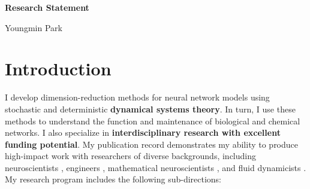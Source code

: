 \documentclass[a4paper,11pt]{article}
\begin{document}
\begin{center}
\Large \textbf{Research Statement}

\Large Youngmin Park
\end{center}

\section{Introduction}

I develop dimension-reduction methods for neural network models using stochastic and deterministic \textbf{dynamical systems theory}. In turn, I use these methods to understand the function and maintenance of biological and chemical networks. I also specialize in \textbf{interdisciplinary research with excellent funding potential}. My publication record demonstrates my ability to produce high-impact work with researchers of diverse backgrounds, including neuroscientists \cite{park2020circuit}, engineers \cite{ermentrout2019recent,park2020high}, mathematical neuroscientists \cite{park2016weakly,park2018infinitesimal,park2018multiple,park2018scalar}, and fluid dynamicists \cite{park2020dynamics}. My research program includes the following sub-directions:
\end{document}
